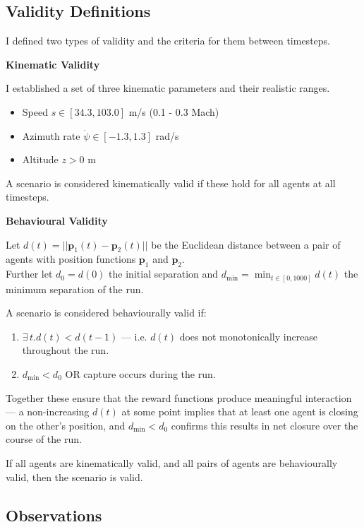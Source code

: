 \subsection{Validity Definitions}
\label{sec:4.1.1}
I defined two types of validity and the criteria for them between timesteps.

\textbf{Kinematic Validity}

I established a set of three kinematic parameters and their realistic ranges.

\begin{itemize}[nosep]
    \item Speed $s \in [34.3, 103.0]$ m/s (0.1 - 0.3 Mach)
    \item Azimuth rate $\dot{\psi} \in [-1.3, 1.3]$ rad/s
    \item Altitude $z > 0$ m
\end{itemize}

A scenario is considered kinematically valid if these hold for all agents at all timesteps.

\textbf{Behavioural Validity}

Let $d(t) = ||\mathbf{p}_1(t) - \mathbf{p}_2(t)||$ be the Euclidean distance between a pair of agents with position functions $\mathbf{p}_1$ and $\mathbf{p}_2$. \\
Further let $d_0 = d(0)$ the initial separation and $d_{\min} = \min_{t \in [0, 1000]} d(t)$ the minimum separation of the run.

A scenario is considered behaviourally valid if:

\begin{enumerate}[nosep]
    \item $\exists\, t.d(t) < d(t-1)$ --- i.e. $d(t)$ does not monotonically increase throughout the run.
    \item $d_{\min} < d_0$ OR capture occurs during the run.
\end{enumerate}

Together these ensure that the reward functions produce meaningful interaction --- a non-increasing $d(t)$ at some point implies that at least one agent is closing on the other's position, and $d_{\min} < d_0$ confirms this results in net closure over the course of the run.


If all agents are kinematically valid, and all pairs of agents are behaviourally valid, then the scenario is valid.

\subsection{Observations}
\label{sec:4.1.2}

